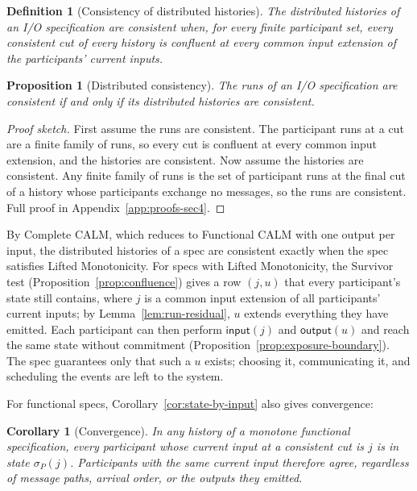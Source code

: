 \documentclass[sigconf]{cidr-2027}
\newtheorem{proposition}{Proposition}
\newtheorem{corollary}{Corollary}
\newtheorem{definition}{Definition}
\theoremstyle{remark}
\newcommand{\commitment}{commitment\xspace}
\newcommand{\indesc}{input extension\xspace} %
\newcommand{\outrel}{extends\xspace}          %
\newcommand{\spectype}[1][]{I/O specification#1\xspace}
\begin{document}
\begin{definition}[Consistency of distributed histories]
\label{def:distributed-consistency}
The distributed histories of an \spectype are \emph{consistent} when, for every
finite participant set, every consistent cut of every history is confluent
at every common \indesc of the participants' current inputs.
\end{definition}

\begin{proposition}[Distributed consistency]
\label{prop:distributed-consistency}
The runs of an \spectype are consistent if and only if its distributed
histories are consistent.
\end{proposition}

\begin{proof}[Proof sketch]
\textcolor{reviewed}{First assume the runs are consistent.} The participant runs at a cut are a
finite family of runs, so every cut is confluent at every common \indesc, and the histories are
consistent. Now assume the histories are consistent. \textcolor{reviewed}{Any finite family of
runs is the set of participant runs at the final cut of a history whose
participants exchange no messages, so the runs are consistent.} Full proof in
Appendix~\ref{app:proofs-sec4}.
\end{proof}

By Complete CALM, which reduces to Functional CALM with one output per input,
the distributed histories of a spec are consistent exactly when the spec
satisfies Lifted Monotonicity. For specs with Lifted Monotonicity, the Survivor test
(Proposition~\ref{prop:confluence}) gives a row $(j,u)$ that every participant's
state still contains, where $j$ is a common \indesc of all participants' current
inputs; by Lemma~\ref{lem:run-residual}, $u$ \outrel everything they have
emitted. Each participant can then perform $\mathsf{input}(j)$ and
$\mathsf{output}(u)$ and reach the same state without \commitment
(Proposition~\ref{prop:exposure-boundary}). The spec guarantees only that such
a $u$ exists; choosing it, communicating it, and scheduling the events are left
to the system.

\textcolor{reviewed}{For functional specs,
Corollary~\ref{cor:state-by-input} also gives convergence:}

\begin{corollary}[Convergence]
\label{cor:convergence}
In any history of a monotone functional specification, every
participant whose current input at a consistent cut is $j$ is in state
$\sigma_P(j)$. Participants with the same current input therefore agree,
regardless of message paths, arrival order, or the outputs they emitted.
\end{corollary}
\end{document}
